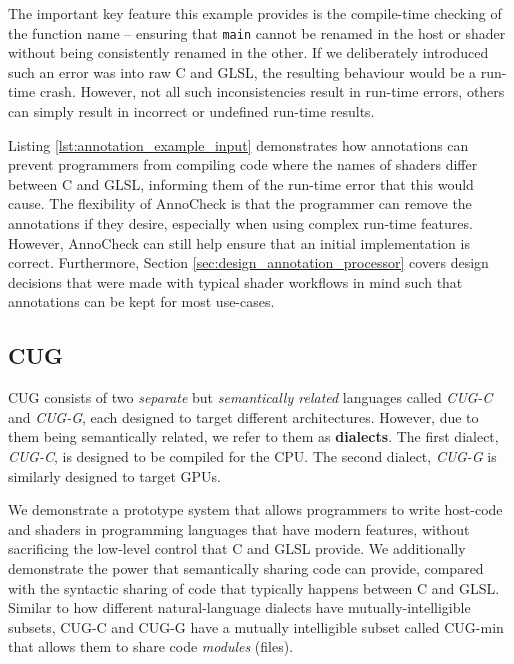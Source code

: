\documentclass[a4paper,12pt,twoside,openright]{report}
\begin{document}
The important key feature this example provides is the compile-time checking of
the function name -- ensuring that \texttt{main} cannot be renamed in the host
or shader without being consistently renamed in the other. If we deliberately
introduced such an error was into raw C and GLSL, the resulting behaviour would
be a run-time crash. However, not all such inconsistencies result in run-time
errors, others can simply result in incorrect or undefined run-time results.

Listing \ref{lst:annotation_example_input} demonstrates how annotations can
prevent programmers from compiling code where the names of shaders differ
between C and GLSL, informing them of the run-time error that this would cause.
The flexibility of AnnoCheck is that the programmer can remove the annotations
if they desire, especially when using complex run-time features. However,
AnnoCheck can still help ensure that an initial implementation is correct.
Furthermore, Section \ref{sec:design_annotation_processor} covers design
decisions that were made with typical shader workflows in mind such that
annotations can be kept for most use-cases.

\subsection{CUG}

CUG consists of two \textit{separate} but \textit{semantically related}
languages called \textit{CUG-C} and \textit{CUG-G}, each designed to target
different architectures. However, due to them being semantically related, we
refer to them as \textbf{dialects}. The first dialect, \textit{CUG-C}, is
designed to be compiled for the CPU. The second dialect, \textit{CUG-G} is
similarly designed to target GPUs.

We demonstrate a prototype system that allows programmers to write host-code
and shaders in programming languages that have modern features, without
sacrificing the low-level control that C and GLSL provide. We additionally
demonstrate the power that semantically sharing code can provide, compared with
the syntactic sharing of code that typically happens between C and GLSL.
Similar to how different natural-language dialects have mutually-intelligible
subsets, CUG-C and CUG-G have a mutually intelligible subset called CUG-min
that allows them to share code \textit{modules} (files).
\end{document}
